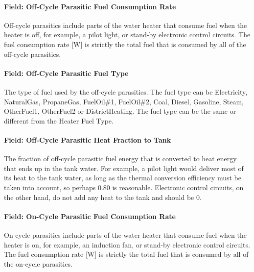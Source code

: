 \paragraph{Field: Off-Cycle Parasitic Fuel Consumption Rate}\label{field-off-cycle-parasitic-fuel-consumption-rate}

Off-cycle parasitics include parts of the water heater that consume fuel when the heater is off, for example, a pilot light, or stand-by electronic control circuits. The fuel consumption rate {[}W{]} is strictly the total fuel that is consumed by all of the off-cycle parasitics.

\paragraph{Field: Off-Cycle Parasitic Fuel Type}\label{field-off-cycle-parasitic-fuel-type}

The type of fuel used by the off-cycle parasitics. The fuel type can be Electricity, NaturalGas, PropaneGas, FuelOil\#1, FuelOil\#2, Coal, Diesel, Gasoline, Steam, OtherFuel1, OtherFuel2 or DistrictHeating. The fuel type can be the same or different from the Heater Fuel Type.

\paragraph{Field: Off-Cycle Parasitic Heat Fraction to Tank}\label{field-off-cycle-parasitic-heat-fraction-to-tank}

The fraction of off-cycle parasitic fuel energy that is converted to heat energy that ends up in the tank water. For example, a pilot light would deliver most of its heat to the tank water, as long as the thermal conversion efficiency must be taken into account, so perhaps 0.80 is reasonable. Electronic control circuits, on the other hand, do not add any heat to the tank and should be 0.

\paragraph{Field: On-Cycle Parasitic Fuel Consumption Rate}\label{field-on-cycle-parasitic-fuel-consumption-rate}

On-cycle parasitics include parts of the water heater that consume fuel when the heater is on, for example, an induction fan, or stand-by electronic control circuits. The fuel consumption rate {[}W{]} is strictly the total fuel that is consumed by all of the on-cycle parasitics.

